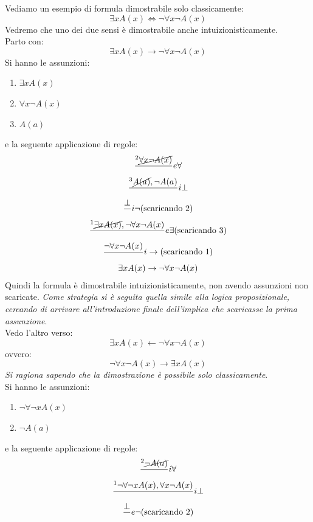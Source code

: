\documentclass[a4paper,12pt, oneside]{book}
\begin{document}
\begin{esempio}
  Vediamo un esempio di formula dimostrabile solo classicamente:
  \[\exists xA(x)\iff \neg \forall x\neg A(x)\]
  Vedremo che uno dei due sensi è dimostrabile anche intuizionisticamente.\\
  Parto con:
  \[\exists xA(x)\to \neg \forall x\neg A(x)\]
  Si hanno le assunzioni:
  \begin{enumerate}
    \item $\exists xA(x)$
    \item $\forall x\neg A(x)$
    \item $A(a)$
  \end{enumerate}
  e la seguente applicazione di regole:
  \begin{gather*}
    \frac{^2\cancel{\forall x\neg A(x)}}{}e\forall\\
    \frac{^3 \cancel{A(a)}, \neg A(a)}{}i\bot\\
    \frac{\bot}{}i\neg\mbox{(scaricando 2)}\\
    \frac{^1\cancel{\exists xA(x)},\neg\forall x\neg
      A(x)}{}e\exists\mbox{(scaricando 3)}\\
    \frac{\neg\forall x\neg A(x)}{}i\to\mbox{(scaricando 1)}\\
    \exists x A(x)\to  \neg \forall x\neg A(x)
  \end{gather*}
  Quindi la formula è dimostrabile intuizionisticamente, non avendo assunzioni
  non scaricate. \textit{Come strategia si è seguita quella simile alla logica
  proposizionale, cercando di arrivare all'introduzione finale dell'implica che
  scaricasse la prima assunzione}.\\
  Vedo l'altro verso:
  \[\exists xA(x)\gets \neg \forall x\neg A(x)\]
  ovvero:
  \[\neg \forall x\neg A(x)\to\exists xA(x)\]
  \emph{Si ragiona sapendo che la dimostrazione è possibile solo
    classicamente}.\\
  Si hanno le assunzioni:
  \begin{enumerate}
    \item $\neg \forall\neg x A(x)$
    \item $\neg A(a)$
  \end{enumerate}
  e la seguente applicazione di regole:
  \begin{gather*}
    \frac{^2\cancel{\neg A(a)}}{}i\forall\\
    \frac{^1 \neg \forall\neg x A(x),\forall x \neg A(x)}{}i\bot\\
    \frac{\bot}{}e\neg\mbox{(scaricando 2)}\\

\end{gather*}
\end{esempio}
\end{document}
